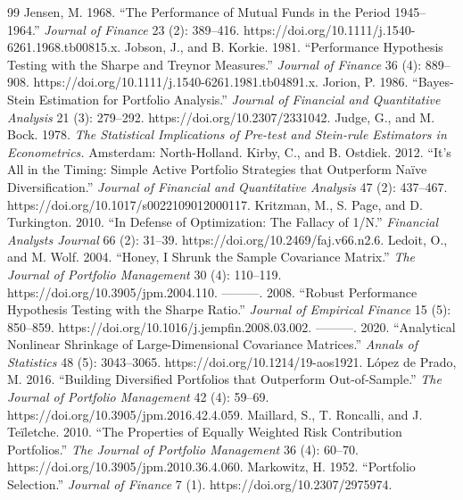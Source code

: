 \documentclass[12pt,letterpaper]{article}
\newcommand{\nuevo}[1]{{\color{nuevoc}#1}}
\begin{document}
\begin{thebibliography}{99}
 \nuevo{Jensen, M. 1968. ``The Performance of Mutual Funds in the Period 1945–1964.'' \emph{Journal of Finance} 23 (2): 389–416. https://doi.org/10.1111/j.1540-6261.1968.tb00815.x.}
 Jobson, J., and B. Korkie. 1981. ``Performance Hypothesis Testing with the Sharpe and Treynor Measures.'' \emph{Journal of Finance} 36 (4): 889–908. https://doi.org/10.1111/j.1540-6261.1981.tb04891.x.
 Jorion, P. 1986. ``Bayes-Stein Estimation for Portfolio Analysis.'' \emph{Journal of Financial and Quantitative Analysis} 21 (3): 279–292. https://doi.org/10.2307/2331042.
 Judge, G., and M. Bock. 1978. \emph{The Statistical Implications of Pre-test and Stein-rule Estimators in Econometrics.} Amsterdam: North-Holland.
 Kirby, C., and B. Ostdiek. 2012. ``It's All in the Timing: Simple Active Portfolio Strategies that Outperform Na\"ive Diversification.'' \emph{Journal of Financial and Quantitative Analysis} 47 (2): 437–467. https://doi.org/10.1017/s0022109012000117.
 Kritzman, M., S. Page, and D. Turkington. 2010. ``In Defense of Optimization: The Fallacy of 1/N.'' \emph{Financial Analysts Journal} 66 (2): 31–39. https://doi.org/10.2469/faj.v66.n2.6.
 Ledoit, O., and M. Wolf. 2004. ``Honey, I Shrunk the Sample Covariance Matrix.'' \emph{The Journal of Portfolio Management} 30 (4): 110–119. https://doi.org/10.3905/jpm.2004.110.
 ---------. 2008. ``Robust Performance Hypothesis Testing with the Sharpe Ratio.'' \emph{Journal of Empirical Finance} 15 (5): 850–859. https://doi.org/10.1016/j.jempfin.2008.03.002.
 ---------. 2020. ``Analytical Nonlinear Shrinkage of Large-Dimensional Covariance Matrices.'' \emph{Annals of Statistics} 48 (5): 3043–3065. https://doi.org/10.1214/19-aos1921.
 L\'opez de Prado, M. 2016. ``Building Diversified Portfolios that Outperform Out-of-Sample.'' \emph{The Journal of Portfolio Management} 42 (4): 59–69. https://doi.org/10.3905/jpm.2016.42.4.059.
 Maillard, S., T. Roncalli, and J. Te\"iletche. 2010. ``The Properties of Equally Weighted Risk Contribution Portfolios.'' \emph{The Journal of Portfolio Management} 36 (4): 60–70. https://doi.org/10.3905/jpm.2010.36.4.060.
 Markowitz, H. 1952. ``Portfolio Selection.'' \emph{Journal of Finance} 7 (1). https://doi.org/10.2307/2975974.

\end{thebibliography}
\end{document}
